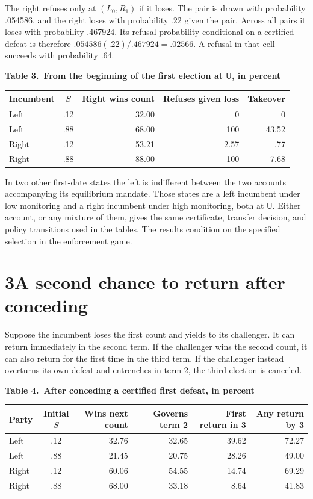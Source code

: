 \documentclass[11pt,letterpaper]{article}
\newcommand{\UU}{\mathsf U}
\begin{document}
The right refuses only at \((L_0,R_1)\) if it loses. The pair is drawn with probability .054586, and the right loses with probability .22 given the pair. Across all pairs it loses with probability .467924. Its refusal probability conditional on a certified defeat is therefore \(.054586(.22)/.467924=.02566\). A refusal in that cell succeeds with probability .64.

\begin{center}\small
\textbf{Table 3.\ From the beginning of the first election at \(\UU\), in percent}\\[5pt]
\begin{tabular}{@{}lcrrr@{}}\toprule
Incumbent & \(S\) & Right wins count & Refuses given loss & Takeover\\\midrule
Left  & .12 & 32.00 & 0       & 0\\
Left  & .88 & 68.00 & 100     & 43.52\\
Right & .12 & 53.21 & 2.57    & .77\\
Right & .88 & 88.00 & 100     & 7.68\\\bottomrule
\end{tabular}
\end{center}

In two other first-date states the left is indifferent between the two accounts accompanying its equilibrium mandate. Those states are a left incumbent under low monitoring and a right incumbent under high monitoring, both at \(\UU\). Either account, or any mixture of them, gives the same certificate, transfer decision, and policy transitions used in the tables. The results condition on the specified selection in the enforcement game.

\newpage
\section*{3\quad A second chance to return after conceding}
Suppose the incumbent loses the first count and yields to its challenger. It can return immediately in the second term. If the challenger wins the second count, it can also return for the first time in the third term. If the challenger instead overturns its own defeat and entrenches in term 2, the third election is canceled.

\begin{center}\small
\textbf{Table 4.\ After conceding a certified first defeat, in percent}\\[5pt]
\begin{tabular}{@{}lcrrrr@{}}\toprule
Party & Initial \(S\) & Wins next count & Governs term 2 & First return in 3 & Any return by 3\\\midrule
Left  & .12 & 32.76 & 32.65 & 39.62 & 72.27\\
Left  & .88 & 21.45 & 20.75 & 28.26 & 49.00\\
Right & .12 & 60.06 & 54.55 & 14.74 & 69.29\\
Right & .88 & 68.00 & 33.18 & 8.64  & 41.83\\\bottomrule
\end{tabular}
\end{center}
\end{document}
